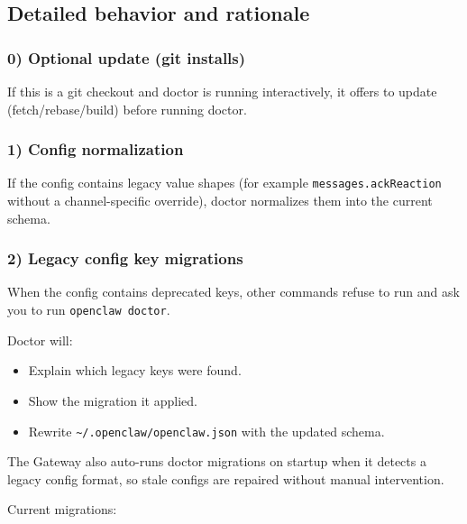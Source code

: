 \subsection{Detailed behavior and rationale}


\subsubsection{0) Optional update (git installs)}


If this is a git checkout and doctor is running interactively, it offers to
update (fetch/rebase/build) before running doctor.

\subsubsection{1) Config normalization}


If the config contains legacy value shapes (for example \texttt{messages.ackReaction}
without a channel-specific override), doctor normalizes them into the current
schema.

\subsubsection{2) Legacy config key migrations}


When the config contains deprecated keys, other commands refuse to run and ask
you to run \texttt{openclaw doctor}.

Doctor will:

\begin{itemize}
  \item Explain which legacy keys were found.
  \item Show the migration it applied.
  \item Rewrite \texttt{\textasciitilde{}/.openclaw/openclaw.json} with the updated schema.
\end{itemize}


The Gateway also auto-runs doctor migrations on startup when it detects a
legacy config format, so stale configs are repaired without manual intervention.

Current migrations:

